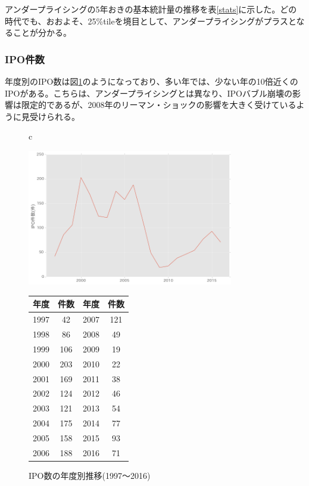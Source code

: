 \documentclass{jsarticle}
\begin{document}
アンダープライシングの5年おきの基本統計量の推移を表\ref{stats}に示した。どの時代でも、おおよそ、25\%tileを境目として、アンダープライシングがプラスとなることが分かる。\par

\subsubsection{IPO件数}
年度別のIPO数は図\ref{fig:year}のようになっており、多い年では、少ない年の10倍近くのIPOがある。こちらは、アンダープライシングとは異なり、IPOバブル崩壊の影響は限定的であるが、2008年のリーマン・ショックの影響を大きく受けているように見受けられる。



\begin{figure}[t]
  \begin{center}
  \caption{IPO数の年度別推移(1997〜2016)}
  \begin{tabular}{c}
  \begin{minipage}{0.5\hsize}
  \begin{center}
    \includegraphics[clip,width=9cm]{./year_count.png}
     \end{center}
\end{minipage}
\begin{minipage}{0.5\hsize}
\begin{center}
    \label{fig:year}
\begin{tabular}{cc|cc}
		\hline
		年度 & 件数 & 年度 & 件数 \\
		\hline \hline
1997  &   42 & 2007  &  121\\
1998  &   86 & 2008   &  49\\
1999   & 106 & 2009  &   19\\
2000 &   203 & 2010  &   22\\
2001  &  169 & 2011   &  38\\
2002 &   124 & 2012  &   46\\
2003 &   121 & 2013 &    54\\
2004 &   175 & 2014   &  77\\
2005 &   158 & 2015  &   93\\
2006  &  188 & 2016 &    71\\
		\hline
	\end{tabular} 
	 \end{center}
	\end{minipage}
	  \end{tabular}
	    \end{center}
\end{figure}
\end{document}
